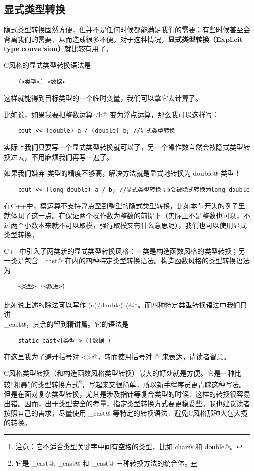 \subsection*{显式类型转换}
隐式类型转换固然方便，但并不是任何时候都能满足我们的需要；有些时候甚至会背离我们的需要，从而造成很多不便。对于这种情况，\textbf{显式类型转换（Explicit type conversion）}就比较有用了。\par
C风格的显式类型转换语法是
\begin{lstlisting}
    (<类型>) <数据>
\end{lstlisting}
这样就能得到目标类型的一个临时变量，我们可以拿它去计算了。\par
比如说，如果我要把整数运算 \lstinline@a/b@ 变为浮点运算，那么我可以这样写：
\begin{lstlisting}
    cout << (double) a / (double) b; //显式类型转换
\end{lstlisting}
实际上我们只要写一个显式类型转换就可以了，另一个操作数自然会被隐式类型转换过去，不用麻烦我们再写一遍了。\par
如果我们嫌弃 \lstinline@double@ 类型的精度不够高，解决方法就是显式地转换为 \lstinline@long double@ 类型！
\begin{lstlisting}
    cout << (long double) a / b; //显式类型转换；b会被隐式转换为long double
\end{lstlisting}\par
在C++中，模运算不支持浮点型到整型的隐式类型转换，比如本节开头的例子里就体现了这一点。在保证两个操作数为整数的前提下（实际上不是整数也可以，不过两个小数本来就不可以取模，强行取模又有什么意思呢），我们也可以使用显式类型转换。\par
C++中引入了两类新的显式类型转换风格：一类是构造函数风格的类型转换；另一类是包含 \lstinline@static_cast@ 在内的四种特定类型转换语法。构造函数风格的类型转换语法为
\begin{lstlisting}
    <类型> (<数据>)
\end{lstlisting}
比如说上述的除法可以写作 \lstinline@double(a)/double(b)@\footnote{注意：它不适合类型关键字中间有空格的类型，比如 \lstinline@unsigned char@ 和 \lstinline@long  double@。}。而四种特定类型转换语法中我们只讲\\\lstinline@static_cast@，其余的留到精讲篇。它的语法是
\begin{lstlisting}
    static_cast<[类型]> ([数据])
\end{lstlisting}
在这里我为了避开括号对 \lstinline@<>@，转而使用括号对 \lstinline@[]@ 来表达，请读者留意。\par
C风格类型转换（和构造函数风格类型转换）最大的好处就是方便。它是一种比较``粗暴''的类型转换方式\footnote{它是 \lstinline@const_cast@, \lstinline@static_cast@ 和 \lstinline@reinterpret_cast@ 三种转换方法的统合体。}，写起来又很简单，所以新手程序员更青睐这种写法。但是在面对复杂类型转换，尤其是涉及指针等复合类型的时候，这样的转换很容易出错。因而，出于类型安全的考量，指定类型转换方式要更稳妥些。我也建议读者按照自己的需求，尽量使用 \lstinline@static_cast@ 等特定的转换语法，避免C风格那种大包大揽的转换。\par

